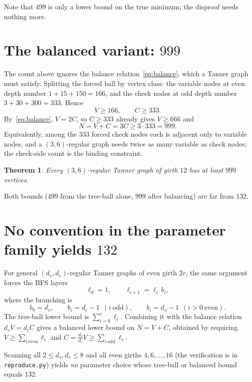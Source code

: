 \documentclass[11pt]{article}
\newtheorem{theorem}{Theorem}
\theoremstyle{definition}
\theoremstyle{remark}
\begin{document}
Note that $499$ is only a lower bound on the true minimum; the disproof needs
nothing more.

\section{The balanced variant: $999$}

The count above ignores the balance relation~\eqref{eq:balance}, which a
Tanner graph must satisfy. Splitting the forced ball by vertex class: the
variable nodes at even depth number $1+15+150=166$, and the check nodes at odd
depth number $3+30+300=333$. Hence
\[
V\ge 166,\qquad C\ge 333 .
\]
By~\eqref{eq:balance}, $V=2C$, so $C\ge 333$ already gives $V\ge 666$ and
\[
N=V+C=3C\ge 3\cdot 333=999 .
\]
Equivalently, among the $333$ forced check nodes each is adjacent only to
variable nodes, and a $(3,6)$-regular graph needs twice as many variable as
check nodes; the check-side count is the binding constraint.

\begin{theorem}
Every $(3,6)$-regular Tanner graph of girth $12$ has at least $999$ vertices.
\end{theorem}

Both bounds ($499$ from the tree-ball alone, $999$ after balancing) are far
from $132$.

\section{No convention in the parameter family yields $132$}

For general $(d_v,d_c)$-regular Tanner graphs of even girth $2r$, the same
argument forces the BFS layers
\[
\ell_0=1,\qquad \ell_{i+1}=\ell_i\, b_i,
\]
where the branching is
\[
b_0=d_v,\qquad b_i=d_c-1\ \ (i\ \text{odd}),\qquad
b_i=d_v-1\ \ (i>0\ \text{even}).
\]
The tree-ball lower bound is $\sum_{i=0}^{r}\ell_i$. Combining it with the
balance relation $d_vV=d_cC$ gives a balanced lower bound on
$N=V+C$, obtained by requiring
$V\ge\sum_{i\ \text{even}}\ell_i$ and
$C=\tfrac{d_v}{d_c}V\ge\sum_{i\ \text{odd}}\ell_i$.

Scanning all $2\le d_v,d_c\le 8$ and all even girths
$4,6,\dots,16$ (the verification is in \texttt{reproduce.py}) yields
\emph{no} parameter choice whose tree-ball or balanced bound equals $132$.
\end{document}
